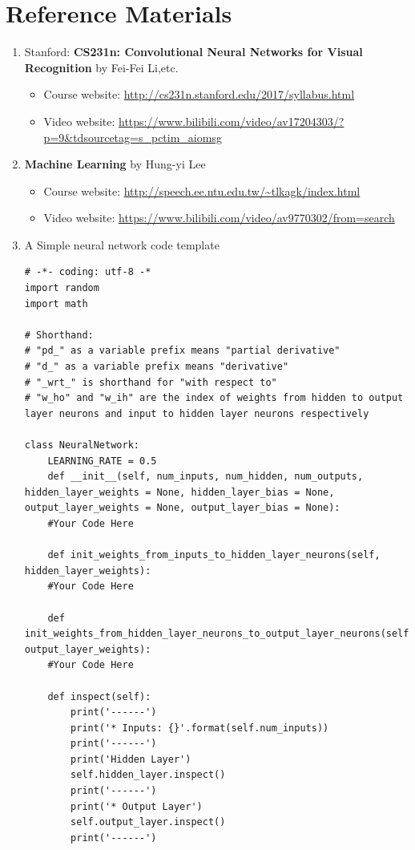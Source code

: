 \documentclass[a4paper, 11pt]{article}
\begin{document}
\section{Reference Materials}
\begin{enumerate}
	\item Stanford: \textbf{CS231n: Convolutional Neural Networks for Visual Recognition} by Fei-Fei Li,etc.
	\begin{itemize}
		\item Course website: \url{http://cs231n.stanford.edu/2017/syllabus.html}
		\item Video website: \url{https://www.bilibili.com/video/av17204303/?p=9&tdsourcetag=s_pctim_aiomsg}
	\end{itemize}

	\item \textbf{Machine Learning} by Hung-yi Lee
	\begin{itemize}
		\item Course website: \url{http://speech.ee.ntu.edu.tw/~tlkagk/index.html}
		\item Video website: \url{https://www.bilibili.com/video/av9770302/from=search}
	\end{itemize}
	\item A Simple neural network code template
\begin{lstlisting}
# -*- coding: utf-8 -*
import random
import math

# Shorthand:
# "pd_" as a variable prefix means "partial derivative"
# "d_" as a variable prefix means "derivative"
# "_wrt_" is shorthand for "with respect to"
# "w_ho" and "w_ih" are the index of weights from hidden to output layer neurons and input to hidden layer neurons respectively

class NeuralNetwork:
    LEARNING_RATE = 0.5
    def __init__(self, num_inputs, num_hidden, num_outputs, hidden_layer_weights = None, hidden_layer_bias = None, output_layer_weights = None, output_layer_bias = None):
    #Your Code Here

    def init_weights_from_inputs_to_hidden_layer_neurons(self, hidden_layer_weights):
    #Your Code Here

    def init_weights_from_hidden_layer_neurons_to_output_layer_neurons(self, output_layer_weights):
    #Your Code Here

    def inspect(self):
        print('------')
        print('* Inputs: {}'.format(self.num_inputs))
        print('------')
        print('Hidden Layer')
        self.hidden_layer.inspect()
        print('------')
        print('* Output Layer')
        self.output_layer.inspect()
        print('------')


\end{lstlisting}
\end{enumerate}
\end{document}
